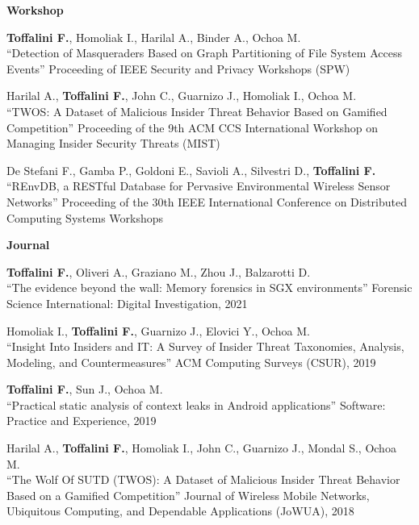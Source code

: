 \textbf{Workshop}\begin{enumerate}[label={[W\arabic*]},leftmargin=5mm]
\item \textbf{Toffalini F.}, Homoliak I., Harilal A., Binder A., Ochoa M.\\``Detection of Masqueraders Based on Graph Partitioning of File System Access Events'' Proceeding of IEEE Security and Privacy Workshops (SPW)
\item Harilal A., \textbf{Toffalini F.}, John C., Guarnizo J., Homoliak I., Ochoa M.\\``TWOS: A Dataset of Malicious Insider Threat Behavior Based on Gamified Competition'' Proceeding of the 9th ACM CCS International Workshop on Managing Insider Security Threats (MIST)
\item De Stefani F., Gamba P., Goldoni E., Savioli A., Silvestri D., \textbf{Toffalini F.}\\``REnvDB, a RESTful Database for Pervasive Environmental Wireless Sensor Networks'' Proceeding of the 30th IEEE International Conference on Distributed Computing Systems Workshops
\end{enumerate}
\textbf{Journal}\begin{enumerate}[label={[J\arabic*]},leftmargin=5mm]
\item \textbf{Toffalini F.}, Oliveri A., Graziano M., Zhou J., Balzarotti D.\\``The evidence beyond the wall: Memory forensics in SGX environments'' Forensic Science International: Digital Investigation, 2021
\item Homoliak I., \textbf{Toffalini F.}, Guarnizo J., Elovici Y., Ochoa M.\\``Insight Into Insiders and IT: A Survey of Insider Threat Taxonomies, Analysis, Modeling, and Countermeasures'' ACM Computing Surveys (CSUR), 2019
\item \textbf{Toffalini F.}, Sun J., Ochoa M.\\``Practical static analysis of context leaks in Android applications'' Software: Practice and Experience, 2019
\item Harilal A., \textbf{Toffalini F.}, Homoliak I., John C., Guarnizo J., Mondal S., Ochoa M.\\``The Wolf Of SUTD (TWOS): A Dataset of Malicious Insider Threat Behavior Based on a Gamified Competition'' Journal of Wireless Mobile Networks, Ubiquitous Computing, and Dependable Applications (JoWUA), 2018
\end{enumerate}
